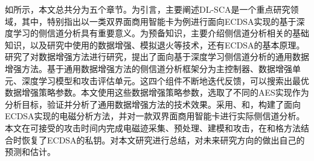 {\begin{figure}[!h]
{{
			}
		}
		\label{fig:thesisstructure}
	\end{figure}
	如所示，本文总共分为五个章节。为引言，主要阐述DL-SCA是一个重点研究领域，其中，特别指出以一类双界面商用智能卡为例进行面向ECDSA实现的基于深度学习的侧信道分析具有重要意义。为预备知识，主要介绍侧信道分析相关的基础知识，以及研究中使用的数据增强、模拟退火等技术，还有ECDSA的基本原理。研究了对数据增强方法进行研究，提出了面向基于深度学习侧信道分析的通用数据增强方法。基于通用数据增强方法的侧信道分析框架分为主控制器、数据增强单元、深度学习模型和攻击评估单元。这四个组件不断地迭代反馈，可以搜索出最优数据增强策略参数。本文使用这些数据增强策略参数，选取了不同的AES实现作为分析目标，验证并分析了通用数据增强方法的技术效果。采用\yuchuli、\shujuzengqiang 和\jiashejianyanguji ，构建了面向ECDSA实现的电磁分析方法，并对一款双界面商用智能卡进行实际侧信道分析。本文在可接受的攻击时间内完成电磁迹采集、预处理、建模和攻击，在和格方法结合时恢复了ECDSA的私钥。对本文研究进行总结，对未来研究方向的做出自己的预测和估计。
}